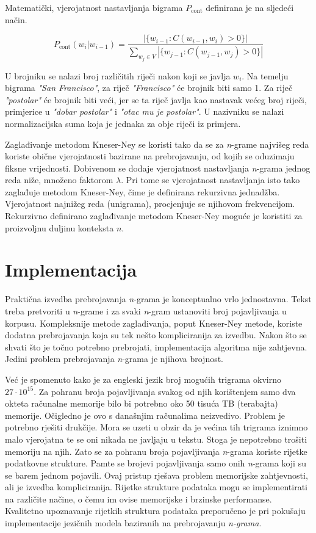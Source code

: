 \documentclass[times, utf8, diplomski, numeric]{fer}
\begin{document}
Matematički, vjerojatnost nastavljanja bigrama $P_{\text{cont}}$ definirana je na sljedeći način.

\[
P_{\text{cont}}(w_i | w_{i - 1}) =
  \frac{\left|\{w_{i - 1} : C(w_{i - 1}, w_i) > 0\}\right|}
  {\sum_{w_j \in V}\left|\{w_{j - 1} : C(w_{j - 1}, w_j) > 0\}\right|}
\]

U brojniku se nalazi broj različitih riječi nakon koji se javlja $w_i$. Na temelju bigrama \textit{"San Francisco"}, za riječ \textit{"Francisco"} će brojnik biti samo 1. Za riječ \textit{"postolar"} će brojnik biti veći, jer se ta riječ javlja kao nastavak većeg broj riječi, primjerice u \textit{"dobar postolar"} i \textit{"otac mu je postolar"}. U nazivniku se nalazi normalizacijska suma koja je jednaka za obje riječi iz primjera.

Zaglađivanje metodom Kneser-Ney se koristi tako da se za \textit{n}-grame najvišeg reda koriste obične vjerojatnosti bazirane na prebrojavanju, od kojih se oduzimaju fiksne vrijednosti. Dobivenom se dodaje vjerojatnost nastavljanja \textit{n}-grama jednog reda niže, množeno faktorom $\lambda$. Pri tome se vjerojatnost nastavljanja isto tako zaglađuje metodom Kneser-Ney, čime je definirana rekurzivna jednadžba. Vjerojatnost najnižeg reda (unigrama), procjenjuje se njihovom frekvencijom. Rekurzivno definirano zaglađivanje metodom Kneser-Ney moguće je koristiti za proizvoljnu duljinu konteksta $n$.

\section{Implementacija}

Praktična izvedba prebrojavanja \textit{n}-grama je konceptualno vrlo jednostavna. Tekst treba pretvoriti u \textit{n}-grame i za svaki \textit{n}-gram ustanoviti broj pojavljivanja u korpusu. Kompleksnije metode zaglađivanja, poput Kneser-Ney metode, koriste dodatna prebrojavanja koja su tek nešto kompliciranija za izvedbu. Nakon što se shvati što je točno potrebno prebrojati, implementacija algoritma nije zahtjevna. Jedini problem prebrojavanja \textit{n}-grama je njihova brojnost.

Već je spomenuto kako je za engleski jezik broj mogućih trigrama okvirno $27 \cdot 10^{15}$. Za pohranu broja pojavljivanja svakog od njih korištenjem samo dva okteta računalne memorije bilo bi potrebno oko 50 tisuća TB (terabajta) memorije. Očigledno je ovo s današnjim računalima neizvedivo. Problem je potrebno rješiti drukčije. Mora se uzeti u obzir da je većina tih trigrama iznimno malo vjerojatna te se oni nikada ne javljaju u tekstu. Stoga je nepotrebno trošiti memoriju na njih. Zato se za pohranu broja pojavljivanja \textit{n}-grama koriste rijetke  podatkovne strukture. Pamte se brojevi pojavljivanja samo onih \textit{n}-grama koji su se barem jednom pojavili. Ovaj pristup rješava problem memorijske zahtjevnosti, ali je izvedba kompliciranija. Rijetke strukture podataka mogu se implementirati na različite načine, o čemu im ovise memorijske i brzinske performanse. Kvalitetno upoznavanje rijetkih struktura podataka preporučeno je pri pokušaju implementacije jezičnih modela baziranih na prebrojavanju \textit{n-grama}.
\end{document}
